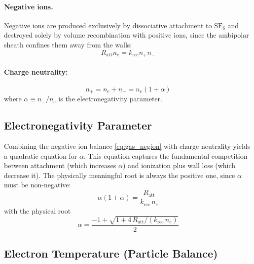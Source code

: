 \documentclass[11pt,a4paper]{report}
\newcommand{\SFsix}{\mathrm{SF}_6}
\begin{document}
\paragraph{Negative ions.} Negative ions are produced exclusively by dissociative attachment to $\SFsix$ and destroyed solely by volume recombination with positive ions, since the ambipolar sheath confines them away from the walls:
\begin{equation}
\boxed{R_\mathrm{att} n_e = k_\mathrm{rec} n_+ n_-}
\label{eq:gas_negion}
\end{equation}

\paragraph{Charge neutrality:}
\begin{equation}
n_+ = n_e + n_- = n_e(1 + \alpha)
\label{eq:gas_charge}
\end{equation}
where $\alpha \equiv n_-/n_e$ is the electronegativity parameter.

\subsection{Electronegativity Parameter}
\label{sec:gasphase_alpha}

Combining the negative ion balance \eqref{eq:gas_negion} with charge neutrality yields a quadratic equation for $\alpha$.  This equation captures the fundamental competition between attachment (which increases $\alpha$) and ionization plus wall loss (which decrease it).  The physically meaningful root is always the positive one, since $\alpha$ must be non-negative:
\begin{equation}
\boxed{\alpha(1+\alpha) = \frac{R_\mathrm{att}}{k_\mathrm{rec}\,n_e}}
\label{eq:gas_alpha_quad}
\end{equation}
with the physical root
\begin{equation}
\alpha = \frac{-1 + \sqrt{1 + 4\,R_\mathrm{att}/(k_\mathrm{rec}\,n_e)}}{2}
\label{eq:gas_alpha_root}
\end{equation}

\subsection{Electron Temperature (Particle Balance)}
\label{sec:gasphase_Te}
\end{document}
